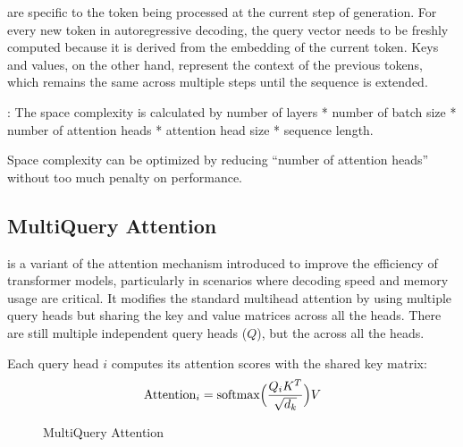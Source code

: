 \documentclass[letterpaper,11pt,english]{sphinxmanual}
\begin{document}
\sphinxAtStartPar
{}  are specific to the token being
processed at the current step of generation. For every new token in
autoregressive decoding, the query vector needs to be freshly computed
because it is derived from the embedding of the current token. Keys and
values, on the other hand, represent the context of the previous tokens,
which remains the same across multiple steps until the sequence is
extended.

\sphinxAtStartPar
{}: The space
complexity is calculated by number of layers * number of batch size * number
of attention heads * attention head size * sequence length.

\sphinxAtStartPar
Space complexity can be optimized by reducing “number of attention
heads” without too much penalty on performance.


\subsection{Multi\sphinxhyphen{}Query Attention}
\label{\detokenize{pretraining:multi-query-attention}}
\sphinxAtStartPar
{} is a variant of the attention mechanism
introduced to improve the efficiency of transformer models, particularly
in scenarios where decoding speed and memory usage are critical. It
modifies the standard multi\sphinxhyphen{}head attention by using multiple query heads
but sharing the key and value matrices across all the heads. There are
still multiple independent query heads (\(Q\)), but the  across all the
heads.

\sphinxAtStartPar
Each query head \(i\) computes its attention scores with the shared
key matrix:
\begin{equation*}
\begin{split}\text{Attention}_i = \text{softmax} \Big({Q_i K^T \over \sqrt{d_k}}\Big)V\end{split}
\end{equation*}
\begin{figure}[htbp]
\centering
\capstart

\noindent{}
\caption{Multi\sphinxhyphen{}Query Attention}\label{\detokenize{pretraining:id19}}\end{figure}
\end{document}
